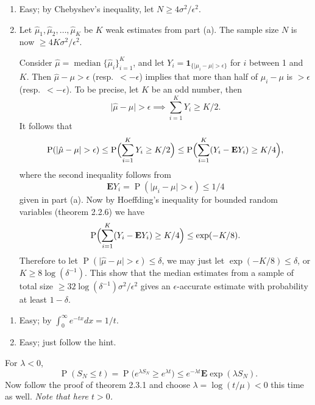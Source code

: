 \documentclass[11pt]{article}
\newcommand{\abs}[1]{\lvert #1 \rvert}
\renewcommand{\Pr}{\operatorname{P}}
\newcommand{\E}{\mathbf{E}}
\newcommand{\I}[1]{\mathbf{1}_{\{#1\}}}
\theoremstyle{plain}
\theoremstyle{definition}
\theoremstyle{remark}
\theoremstyle{definition}
\newenvironment{mansol}[1]{%
  \renewcommand\themansolinner{#1}%
  \mansolinner
}{\endmansolinner}
\begin{document}
\begin{mansol}{2.2.9}
\begin{enumerate}[label=(\alph*)]
    \item Easy; by Chebyshev's inequality, let $N \geq 4 \sigma^2 / \epsilon^2$.
    \item Let $\hat{\mu}_1,\hat{\mu}_2,\ldots,\hat{\mu}_K$ be $K$ weak estimates from part (a). The sample size $N$ is now $\geq 4K \sigma^2/\epsilon^2$.

    Consider $\hat \mu = \operatorname{median}\{\hat \mu_i\}_{i=1}^K$, and let $Y_i = \I{\abs{\mu_i - \mu} > \epsilon}$ for $i$ between 1 and $K$. Then $\hat \mu - \mu > \epsilon$ (resp.\ $< -\epsilon$) implies that more than half of $\mu_i - \mu$ is $> \epsilon$ (resp.\ $< -\epsilon$). To be precise, let $K$ be an odd number, then \[\abs{\hat\mu - \mu} > \epsilon \implies \sum_{i=1}^K Y_i \geq K/2.\] It follows that \[
        \Pr(\abs{\hat \mu - \mu} > \epsilon) \leq \Pr\Bigl(\sum_{i=1}^K Y_i \geq K/2\Bigr) \leq \Pr\Bigl(\sum_{i=1}^K (Y_i - \E Y_i) \geq K/4\Bigr),
    \]
    where the second inequality follows from \[\E Y_i = \Pr(\abs{\mu_i - \mu} > \epsilon) \leq 1/4\] given in part (a). Now by Hoeffding's inequality for bounded random variables (theorem 2.2.6) we have \[
    \Pr\Bigl(\sum_{i=1}^K (Y_i - \E Y_i) \geq K/4\Bigr) \leq \exp(- K / 8).
    \]
    Therefore to let $\Pr(\abs{\hat \mu - \mu} > \epsilon) \leq \delta$, we may just let $\exp(- K / 8) \leq \delta$, or $K \geq 8 \log(\delta^{-1})$. This show that the median estimates from a sample of total size $\geq 32 \log(\delta^{-1}) \sigma^2/\epsilon^2$ gives an $\epsilon$-accurate estimate with probability at least $1-\delta$.
\end{enumerate}
\end{mansol}

\begin{mansol}{2.2.10}
\begin{enumerate}[label=(\alph*)]
\item Easy; by $\int_0^\infty e^{-tx} dx = 1/t$.
\item Easy; just follow the hint.
\end{enumerate}
\end{mansol}

\begin{mansol}{2.3.2}
For $\lambda < 0$, \[\Pr(S_N \leq t) = \Pr\bigl(e^{\lambda S_N} \geq e^{\lambda t}\bigr) \leq e^{-\lambda t} \E \exp(\lambda S_N).\]
Now follow the proof of theorem 2.3.1 and choose $\lambda = \log(t/\mu) < 0$ this time as well. \textit{Note that here $t > 0$.}
\end{mansol}
\end{document}
